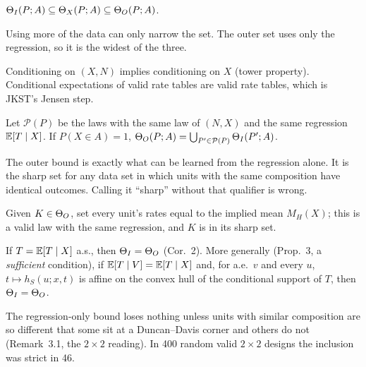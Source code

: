 \begin{result}\label{res:p2a-p1}
 $\Theta_I(P;A)\subseteq\Theta_X(P;A)\subseteq\Theta_O(P;A)$.
\end{result}
\begin{plain}
Using more of the data can only narrow the set. The outer set uses only the
regression, so it is the widest of the three.
\end{plain}
\begin{sketch}
Conditioning on $(X,N)$ implies conditioning on $X$ (tower property). Conditional
expectations of valid rate tables are valid rate tables, which is JKST's Jensen
step.
\end{sketch}

\begin{result}\label{res:p2a-p2}
 Let $\mathcal P(P)$ be the laws with the same law of $(N,X)$
and the same regression $\mathbb E[T\mid X]$. If $P(X\in A)=1$,
$\Theta_O(P;A)=\bigcup_{P'\in\mathcal P(P)}\Theta_I(P';A)$.
\end{result}
\begin{plain}
The outer bound is exactly what can be learned from the regression alone. It is
the sharp set for any data set in which units with the same composition have
identical outcomes. Calling it ``sharp'' without that qualifier is wrong.
\end{plain}
\begin{sketch}
Given $K\in\Theta_O$, set every unit's rates equal to the implied mean $M_H(X)$;
this is a valid law with the same regression, and $K$ is in its sharp set.
\end{sketch}

\begin{result}
 If $T=\mathbb E[T\mid X]$ a.s., then $\Theta_I=\Theta_O$ (Cor.~2). More
generally (Prop.~3, a \emph{sufficient} condition), if $\mathbb E[T\mid V]=\mathbb E[T\mid X]$
and, for a.e.\ $v$ and every $u$, $t\mapsto h_S(u;x,t)$ is affine on the
convex hull of the conditional support of $T$, then $\Theta_I=\Theta_O$.
\end{result}
\begin{plain}
The regression-only bound loses nothing unless units with similar composition
are so different that some sit at a Duncan--Davis corner and others do not
(Remark~3.1, the $2\times2$ reading). In 400 random valid $2\times2$ designs the
inclusion was strict in 46.
\end{plain}

